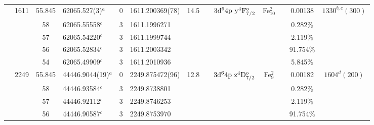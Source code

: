 \begin{table*}
\begin{center}
{\begin{tabular}{:l;l;c;l;c;l;c;l;l;c;c;c;c}
                                  & 1611   & 55.845    & 62065.527(3)$^{a}$               & 0 &   1611.200369(78)  & 14.5 & $                                        $ & $3\rm{d}^64\rm{p~y}^4\rm{F}_{7/2}^{\rm o}$ & Fe$^2_{10}$ &              & 0.00138   & $ 1330^{b,c}(300)$\\
\rowstyle{\itshape}               &        & 58        & 62065.55558$^{c}$                & 3 &  1611.1996271      &      & $                                        $ & $                                        $ &             &              & 0.282\%   & $     ^{}     $\\
\rowstyle{\itshape}               &        & 57        & 62065.54220$^{c}$                & 3 &  1611.1999744      &      & $                                        $ & $                                        $ &             &              & 2.119\%   & $     ^{}     $\\
\rowstyle{\itshape}               &        & 56        & 62065.52834$^{c}$                & 3 &  1611.2003342      &      & $                                        $ & $                                        $ &             &              & 91.754\%  & $     ^{}     $\\
\rowstyle{\itshape}               &        & 54        & 62065.49909$^{c}$                & 3 &  1611.2010936      &      & $                                        $ & $                                        $ &             &              & 5.845\%   & $     ^{}     $\\
                                  & 2249   & 55.845    & 44446.9044(19)$^{a}$             & 0 &   2249.875472(96)  & 12.8 & $                                        $ & $3\rm{d}^64\rm{p~z}^4\rm{D}_{7/2}^{\rm o}$ & Fe$^2_{9}$  &              & 0.00182   & $ 1604^{d}(200)$\\
\rowstyle{\itshape}               &        & 58        & 44446.93584$^{c}$                & 3 &  2249.8738801      &      & $                                        $ & $                                        $ &             &              & 0.282\%   & $     ^{}     $\\
\rowstyle{\itshape}               &        & 57        & 44446.92112$^{c}$                & 3 &  2249.8746253      &      & $                                        $ & $                                        $ &             &              & 2.119\%   & $     ^{}     $\\
\rowstyle{\itshape}               &        & 56        & 44446.90587$^{c}$                & 3 &  2249.8753970      &      & $                                        $ & $                                        $ &             &              & 91.754\%  & $     ^{}     $\\

\end{tabular}}
\end{center}
\end{table*}
